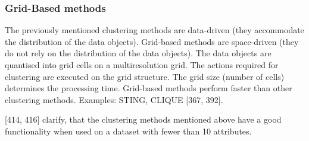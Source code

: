 



 

\subsubsection{Grid-Based methods}
The previously mentioned clustering methods are data-driven (they accommodate the distribution of the data objects). Grid-based methods are space-driven (they do not rely on the distribution of the data objects). The data objects are quantised into grid cells on a multiresolution grid. The actions required for clustering are executed on the grid structure. The grid size (number of cells) determines the processing time. Grid-based methods perform faster than other clustering methods. Examples: STING, CLIQUE \autocite{han2011data}[367, 392].

  

\vspace{5mm} %
\textcite{han2011data}[414, 416] clarify, that the clustering methods mentioned above have a good functionality when used on a dataset with fewer than 10 attributes. 

